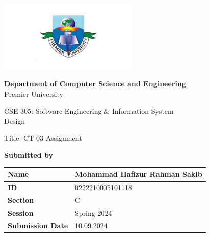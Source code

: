 \documentclass{scrreprt}
\renewcommand{\arraystretch}{1.5} %
\begin{document}
\begin{titlepage}
    \centering
    \begin{center}
        \includegraphics[width=0.5\textwidth]{logo.png} %
    \end{center}
\begin{center}
    \textbf{Department of Computer Science and Engineering}\\
    Premier University
\end{center}
\begin{center}
  \begin{center}
    \huge \textnormal{CSE 305: Software Engineering \& Information System\\ Design}
\end{center}
    \vspace{1in} %
    \Large \textnormal{Title: CT-03 Assignment}
    \vspace{0.5in} %
\end{center}

    \large
    \textbf {Submitted by}\\
   \begin{center}
\renewcommand{\arraystretch}{1.5} %
\begin{tabular}{|p{}|p{}|} %
\hline
\textbf{Name} & Mohammad Hafizur Rahman Sakib \\
\hline
\textbf{ID} & 0222210005101118 \\
\hline
\textbf{Section} & C \\
\hline
\textbf{Session} & Spring 2024 \\
\hline
\textbf{Submission Date} & 10.09.2024 \\
\hline
\end{tabular}
\end{center}

    \vspace{0.5in}
 

\end{titlepage}
\end{document}

